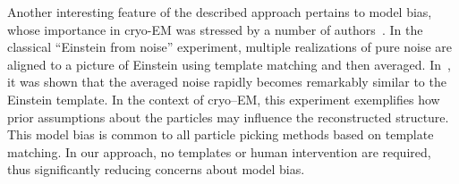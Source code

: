\documentclass[9pt,twocolumn,twoside,lineno]{pnas-new}
\begin{document}
Another interesting feature of the described approach pertains to model bias, whose importance in cryo-EM was stressed by a number of authors~\cite{shatsky2009method,vanheel1992correlation,henderson2013avoiding,vanheel2013finding}. In the classical ``Einstein from noise'' experiment, multiple realizations of pure noise are aligned to a picture of Einstein using template matching and then averaged. In~\cite{shatsky2009method}, it was shown that the averaged noise rapidly becomes remarkably similar to the Einstein template. In the context of cryo--EM, this experiment exemplifies how prior assumptions about the particles may influence the reconstructed structure. This model bias is common to all particle picking methods based on template matching. In our approach, no templates or human intervention are required, thus significantly reducing concerns about model bias. %


%
\end{document}
